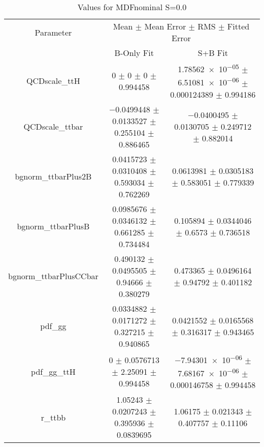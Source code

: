 \begin{table}
\centering
\caption{Values for MDFnominal S=0.0}
\begin{tabular}{ccc}
\toprule
Parameter & \multicolumn{2}{c}{Mean $\pm$ Mean Error $\pm$ RMS $\pm$ Fitted Error}\\
 & B-Only Fit & S+B Fit\\
\midrule
QCDscale\_ttH & \num{0} $\pm$ \num{0} $\pm$ \num{0} $\pm$ \num{0.994458} & \num{1.78562e-05} $\pm$ \num{6.51081e-06} $\pm$ \num{0.000124389} $\pm$ \num{0.994186}\\
QCDscale\_ttbar & \num{-0.0499448} $\pm$ \num{0.0133527} $\pm$ \num{0.255104} $\pm$ \num{0.886465} & \num{-0.0400495} $\pm$ \num{0.0130705} $\pm$ \num{0.249712} $\pm$ \num{0.882014}\\
bgnorm\_ttbarPlus2B & \num{0.0415723} $\pm$ \num{0.0310408} $\pm$ \num{0.593034} $\pm$ \num{0.762269} & \num{0.0613981} $\pm$ \num{0.0305183} $\pm$ \num{0.583051} $\pm$ \num{0.779339}\\
bgnorm\_ttbarPlusB & \num{0.0985676} $\pm$ \num{0.0346132} $\pm$ \num{0.661285} $\pm$ \num{0.734484} & \num{0.105894} $\pm$ \num{0.0344046} $\pm$ \num{0.6573} $\pm$ \num{0.736518}\\
bgnorm\_ttbarPlusCCbar & \num{0.490132} $\pm$ \num{0.0495505} $\pm$ \num{0.94666} $\pm$ \num{0.380279} & \num{0.473365} $\pm$ \num{0.0496164} $\pm$ \num{0.94792} $\pm$ \num{0.401182}\\
pdf\_gg & \num{0.0334882} $\pm$ \num{0.0171272} $\pm$ \num{0.327215} $\pm$ \num{0.940865} & \num{0.0421552} $\pm$ \num{0.0165568} $\pm$ \num{0.316317} $\pm$ \num{0.943465}\\
pdf\_gg\_ttH & \num{0} $\pm$ \num{0.0576713} $\pm$ \num{2.25091} $\pm$ \num{0.994458} & \num{-7.94301e-06} $\pm$ \num{7.68167e-06} $\pm$ \num{0.000146758} $\pm$ \num{0.994458}\\
r\_ttbb & \num{1.05243} $\pm$ \num{0.0207243} $\pm$ \num{0.395936} $\pm$ \num{0.0839695} & \num{1.06175} $\pm$ \num{0.021343} $\pm$ \num{0.407757} $\pm$ \num{0.11106}\\
\bottomrule
\end{tabular}
\end{table}